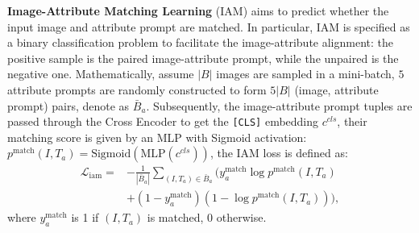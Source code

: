 \documentclass[sigconf]{acmart}
\begin{document}
\noindent\textbf{Image-Attribute Matching Learning}
(IAM) aims to predict whether the input image and attribute prompt are matched. 
In particular, IAM is specified as a binary classification problem to facilitate the image-attribute alignment: the positive sample is the paired image-attribute prompt, while the unpaired is the negative one.
Mathematically, assume $|B|$ images are sampled in a mini-batch, $5$ attribute prompts are randomly constructed to form $5|B|$ (image, attribute prompt) pairs, denote as $\bar{B}_a$.
Subsequently, the image-attribute prompt tuples are passed through the Cross Encoder to get the \texttt{[CLS]} embedding $c^{cls}$, their matching score is given by an MLP with Sigmoid activation: $p^{\text{match}}(I, T_a) = \text{Sigmoid}(\text{MLP}(c^{cls}))$,
the IAM loss is defined as: 
\vspace{-.1in}
\begin{equation}
\begin{split}
\mathcal{L}_{\text{iam}} =& -\frac{1}{|\bar{B}_a|} \sum_{(I, T_a)\in \bar{B}_a}(y^{\text{match}}_a\log p^{\text{match}}(I, T_a)\\
&+ (1-y^{\text{match}}_a)(1-\log p^{\text{match}}(I, T_a))), \label{eq:litm} 
\end{split}
\end{equation}
where $y^{\text{match}}_a$ is 1 if $(I, T_a)$ is matched, 0  otherwise.
\end{document}
